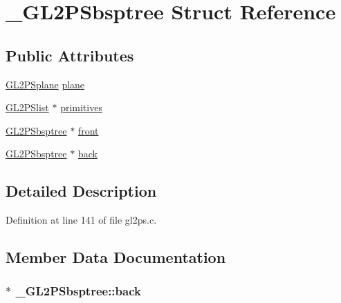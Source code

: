 \hypertarget{struct___g_l2_p_sbsptree}{}\section{\+\_\+\+G\+L2\+P\+Sbsptree Struct Reference}
\label{struct___g_l2_p_sbsptree}
\subsection*{Public Attributes}
\begin{DoxyCompactItemize}
\item 
\hyperlink{gl2ps_8c_ad999e09482788b5c0f9b7c6197a32e0d}{G\+L2\+P\+Splane} \hyperlink{struct___g_l2_p_sbsptree_a9efcd25df38bdf307566113297414883}{plane}
\item 
\hyperlink{struct_g_l2_p_slist}{G\+L2\+P\+Slist} $\ast$ \hyperlink{struct___g_l2_p_sbsptree_a548681245d379e2c0f98ed5189911609}{primitives}
\item 
\hyperlink{gl2ps_8c_a70dafc1a0d6da08fe9eb18b641ac22b0}{G\+L2\+P\+Sbsptree} $\ast$ \hyperlink{struct___g_l2_p_sbsptree_a25786438125ba05b44f2aa2d4ff1fb2c}{front}
\item 
\hyperlink{gl2ps_8c_a70dafc1a0d6da08fe9eb18b641ac22b0}{G\+L2\+P\+Sbsptree} $\ast$ \hyperlink{struct___g_l2_p_sbsptree_a50f02f7a697e445a57b34f1a14d33355}{back}
\end{DoxyCompactItemize}


\subsection{Detailed Description}


Definition at line 141 of file gl2ps.\+c.



\subsection{Member Data Documentation}
\hypertarget{struct___g_l2_p_sbsptree_a50f02f7a697e445a57b34f1a14d33355}{}
\subsubsection[{back}]{ $\ast$ \+\_\+\+G\+L2\+P\+Sbsptree\+::back}\label{struct___g_l2_p_sbsptree_a50f02f7a697e445a57b34f1a14d33355}


